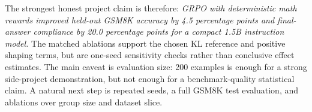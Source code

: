 \documentclass[11pt]{article}
\begin{document}
The strongest honest project claim is therefore: \emph{GRPO with deterministic math rewards improved held-out GSM8K accuracy by 4.5 percentage points and final-answer compliance by 20.0 percentage points for a compact 1.5B instruction model.} The matched ablations support the chosen KL reference and positive shaping terms, but are one-seed sensitivity checks rather than conclusive effect estimates. The main caveat is evaluation size: 200 examples is enough for a strong side-project demonstration, but not enough for a benchmark-quality statistical claim. A natural next step is repeated seeds, a full GSM8K test evaluation, and ablations over group size and dataset slice.
\end{document}
